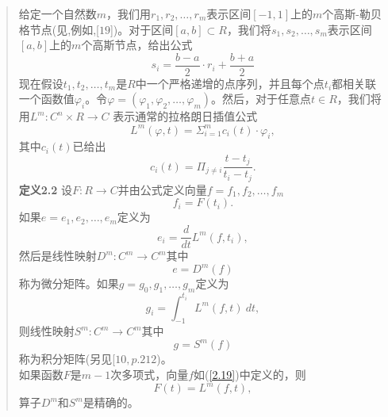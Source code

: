 \documentclass{article}
\begin{document}
\begin{CJK}{UTF8}{gkai}
\begin{quotation}
给定一个自然数$m$，我们用$r_1, r_2,\ldots,r_m$表示区间$[-1,1]$上的$m$个高斯-勒贝格节点(见,例如,[$19$])。对于区间$[a,b]\subset R$，我们将$s_1,s_2,\ldots,s_m$表示区间$[a, b]$上的$m$个高斯节点，给出公式\\
\begin{equation}
s_i=\frac{b-a}{2} \cdot r_i +\frac{b+a}{2}
\end{equation}
现在假设$t_1,t_2,\ldots,t_m$是$R$中一个严格递增的点序列，并且每个点$t_i$都相关联一个函数值$\varphi_i$。令$\varphi=(\varphi_1,\varphi_2,\ldots,\varphi_m)$。然后，对于任意点$t \in R$，我们将用$L^m:C^n \times R\rightarrow C$ 表示通常的拉格朗日插值公式\\
\begin{equation}
L^m(\varphi,t)=\Sigma_{i=1}^{m}c_i(t) \cdot \varphi_i,
\end{equation}
其中$c_i(t)$已给出\\
\begin{equation}
c_i(t)=\Pi_{j\neq i} \frac{t-t_j}{t_i-t_j}.
\end{equation}
\textbf{定义2.2} 设$F:R\rightarrow C$并由公式定义向量$f={f_1,f_2,\ldots,f_m}$\\
\begin{equation}
\label{2.19}
f_i=F(t_i).
\end{equation}
如果$e = {e_1,e_2,\ldots,e_m}$定义为\\
\begin{equation}
e_i=\frac{d}{dt}L^m(f,t_i),
\end{equation}
然后是线性映射$D^m:C^m\rightarrow C^m$其中\\
\begin{equation}
e=D^m(f)
\label{2.21}
\end{equation}
称为微分矩阵。如果$g = {g_0, g_1,\ldots,g_m}$定义为\\
\begin{equation}
g_i= \int _{-1}^{t_i} L^m(f,t)~dt,
\end{equation}
则线性映射$S^m:C^m\rightarrow C^m$其中\\
\begin{equation}
g=S^m(f)
\label{2.23}
\end{equation}
称为积分矩阵(另见[$10,p.212$)。\\

如果函数$F$是$m-1$次多项式，向量$f$如(\ref{2.19})中定义的，则\\
\begin{equation}
F(t)=L^m(f,t),
\end{equation}
算子$D^m$和$S^m$是精确的。\\


\end{quotation}
\end{CJK}
\end{document}
